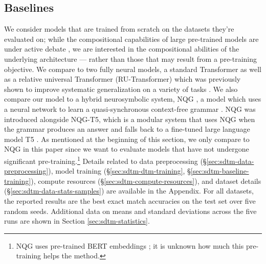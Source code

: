 \subsection{Baselines}
We consider models that are trained from scratch on the datasets they're evaluated on; while the compositional capabilities of large pre-trained models are under active debate \citep{najoung}, we are interested in the compositional abilities of the underlying architecture --- rather than those that may result from a pre-training objective.
We compare \sdtm to two fully neural models, a standard Transformer \citep{vaswani2017attention} as well as a relative universal Transformer (RU-Transformer) which was previously shown to improve systematic generalization on a variety of tasks \citep{csordas-etal-2021-devil}. We also compare our model to a hybrid neurosymbolic system, NQG \citep{shaw-etal-2021-compositional, Sun_2023_ReplicationStudyCompositional}, a model which uses a neural network to learn a quasi-synchronous context-free grammar \citep{smith-eisner-2006-quasi}. NQG was introduced alongside NQG-T5, which is a modular system that uses NQG when the grammar produces an answer and falls back to a fine-tuned large language model T5 \citep{t5}. As mentioned at the beginning of this section, we only compare to NQG in this paper since we want to evaluate models that have not undergone significant pre-training.\footnote{NQG uses pre-trained BERT embeddings \citep{devlin2019bert}; it is unknown how much this pre-training helps the method.} Details related to data preprocessing (\S\ref{sec:sdtm-data-preprocessing}), model training (\S\ref{sec:sdtm-dtm-training}, \S\ref{sec:sdtm-baseline-training}), compute resources (\S\ref{sec:sdtm-compute-resources}), and dataset details (\S\ref{sec:sdtm-data-stats-samples}) are available in the Appendix. For all datasets, the reported results are the best exact match accuracies on the test set over five random seeds. Additional data on means and standard deviations across the five runs are shown in Section \ref{sec:sdtm-statistics}.

